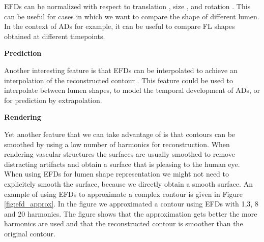 \documentclass[thesis.tex]{subfiles}
\begin{document}
EFDs can be normalized with respect to translation \cite{giardinia}, size \cite{giardinia}, and rotation \cite{lin1987new, giardinia}. This can be useful for cases in which we want to compare the shape of different lumen. In the context of ADs for example, it can be useful to compare FL shapes obtained at different timepoints. 

\textbf{Prediction}

Another interesting feature is that EFDs can be interpolated to achieve an interpolation of the reconstructed contour \cite{jeong2007reslicing}. This feature could be used to interpolate between lumen shapes, to model the temporal development of ADs, or for prediction by extrapolation. 

\textbf{Rendering}

Yet another feature that we can take advantage of is that contours can be smoothed by using a low number of harmonics for reconstruction. When rendering vascular structures the surfaces are usually smoothed to remove distracting artifacts and obtain a surface that is pleasing to the human eye. When using EFDs for lumen shape representation we might not need to explicitely smooth the surface, because we directly obtain a smooth surface. 
An example of using EFDs to approximate a complex contour is given in Figure \ref{fig:efd_approx}. In the figure we approximated a contour using EFDs with 1,3, 8 and 20 harmonics. The figure shows that the approximation gets better the more harmonics are used and that the reconstructed contour is smoother than the original contour.
\end{document}

